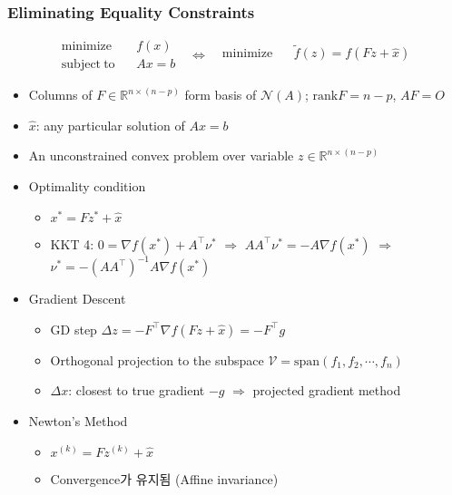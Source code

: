 \subsubsection*{Eliminating Equality Constraints}
\begin{equation}\begin{aligned}
    \mathrm{minimize}~~&~~f(x) \\
    \mathrm{subject~to}~~&~~Ax=b
\end{aligned}~~~\Leftrightarrow~~~\begin{aligned}
    \mathrm{minimize}~~&~~\tilde{f}(z)=f(Fz+\hat{x}) \\ {}
\end{aligned}\end{equation}
\begin{itemize}
    \item Columns of $F\in\mathbb{R}^{n\times(n-p)}$ form basis of $\mathcal{N}(A)$; $\mathrm{rank}F = n-p$, $AF=O$
    \item $\hat{x}$: any particular solution of $Ax=b$
    \item An unconstrained convex problem over variable $z\in\mathbb{R}^{n\times(n-p)}$
    \item Optimality condition
    \begin{itemize}
        \item $x^\ast=Fz^\ast+\hat{x}$
        \item KKT 4: $0=\nabla f(x^\ast)+A^{\top}\nu^\ast$ $\Rightarrow$ $AA^{\top}\nu^\ast=-A\nabla f(x^\ast)$ $\Rightarrow$ $\nu^\ast=-(AA^{\top})^{-1}A\nabla f(x^\ast)$
    \end{itemize}
    \item Gradient Descent
    \begin{itemize}
        \item GD step $\Delta z=-F^{\top}\nabla f(Fz+\hat{x})=-F^{\top}g$
        \item Orthogonal projection to the subspace $\mathcal{V}=\mathrm{span}(f_1,f_2,\cdots,f_n)$
        \item $\Delta x$: closest to true gradient $-g$ $\Rightarrow$ projected gradient method
    \end{itemize}
    \item Newton's Method
    \begin{itemize}
        \item $x^{(k)}=Fz^{(k)}+\hat{x}$
        \item Convergence가 유지됨 (Affine invariance)
    \end{itemize}
\end{itemize}

